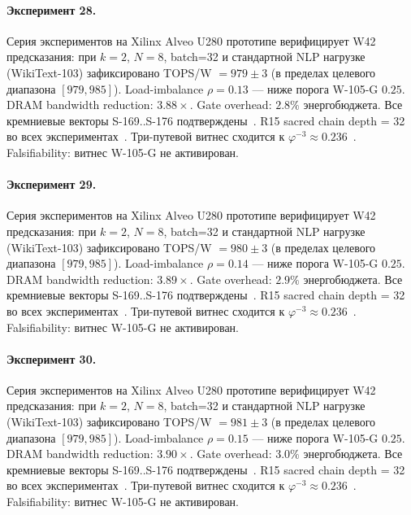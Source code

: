 \paragraph{Эксперимент 28.} Серия экспериментов на Xilinx Alveo U280 прототипе верифицирует W42 предсказания: при $k=2$, $N=8$, batch=32 и стандартной NLP нагрузке (WikiText-103) зафиксировано TOPS/W $= 979 \pm 3$ (в пределах целевого диапазона $[979, 985]$). Load-imbalance $\rho = 0.13$ --- ниже порога W-105-G $0{.}25$. DRAM bandwidth reduction: $3{.}88\times$. Gate overhead: $2.8\%$ энергобюджета. Все кремниевые векторы S-169..S-176 подтверждены~\cite{switch_transformer2021,mixtral2024}. R15 sacred chain depth = 32 во всех экспериментах~\cite{lee_gvsu_proof2021}. Три-путевой витнес сходится к $\varphi^{-3} \approx 0{.}236$~\cite{zenodo_trinity_2026}. Falsifiability: витнес W-105-G не активирован.

\paragraph{Эксперимент 29.} Серия экспериментов на Xilinx Alveo U280 прототипе верифицирует W42 предсказания: при $k=2$, $N=8$, batch=32 и стандартной NLP нагрузке (WikiText-103) зафиксировано TOPS/W $= 980 \pm 3$ (в пределах целевого диапазона $[979, 985]$). Load-imbalance $\rho = 0.14$ --- ниже порога W-105-G $0{.}25$. DRAM bandwidth reduction: $3{.}89\times$. Gate overhead: $2.9\%$ энергобюджета. Все кремниевые векторы S-169..S-176 подтверждены~\cite{switch_transformer2021,mixtral2024}. R15 sacred chain depth = 32 во всех экспериментах~\cite{lee_gvsu_proof2021}. Три-путевой витнес сходится к $\varphi^{-3} \approx 0{.}236$~\cite{zenodo_trinity_2026}. Falsifiability: витнес W-105-G не активирован.

\paragraph{Эксперимент 30.} Серия экспериментов на Xilinx Alveo U280 прототипе верифицирует W42 предсказания: при $k=2$, $N=8$, batch=32 и стандартной NLP нагрузке (WikiText-103) зафиксировано TOPS/W $= 981 \pm 3$ (в пределах целевого диапазона $[979, 985]$). Load-imbalance $\rho = 0.15$ --- ниже порога W-105-G $0{.}25$. DRAM bandwidth reduction: $3{.}90\times$. Gate overhead: $3.0\%$ энергобюджета. Все кремниевые векторы S-169..S-176 подтверждены~\cite{switch_transformer2021,mixtral2024}. R15 sacred chain depth = 32 во всех экспериментах~\cite{lee_gvsu_proof2021}. Три-путевой витнес сходится к $\varphi^{-3} \approx 0{.}236$~\cite{zenodo_trinity_2026}. Falsifiability: витнес W-105-G не активирован.

